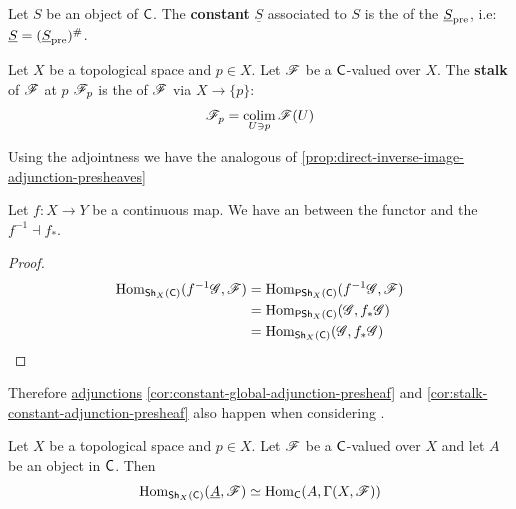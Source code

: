 \documentclass[../main.tex]{subfiles}
\begin{document}
\begin{definition} \label{def:constant-sheaf}
  Let \(S\) be an object of \(\mathsf{C}\).
  The \textbf{constant } \(\underline{S}\) associated to \(S\) is the  of the  \(\underline{S}_{\operatorname*{pre}}\), i.e: \(\underline{S} = (\underline{S}_{\operatorname*{pre}})^{\#}\).
\end{definition}

\begin{definition}[Stalk] \label{def:stalk-sheaf}
  Let \(X\) be a topological space and \(p \in X\). Let \(\mathscr{F}\) be a \(\mathsf{C}\)-valued  over \(X\).
  The \textbf{stalk} of \(\mathscr{F}\) at \(p\) \(\mathscr{F}_{p}\) is the  of \(\mathscr{F}\) via \(X \to \{p\}\):
  \begin{align*}
    \mathscr{F}_{p} = \operatorname*{colim}_{U \ni p} \mathscr{F}(U)
  \end{align*}
\end{definition}


Using the adjointness we have the analogous of \autoref{prop:direct-inverse-image-adjunction-presheaves}
\begin{proposition}
  Let \(f: X \to Y\) be a continuous map.
  We have an  between the  functor and the  \(f^{-1} \dashv f_{\ast}\).
\end{proposition}
\begin{proof}
  \begin{align*}
    \operatorname{Hom}_{\mathsf{Sh}_{X}(\mathsf{C})}(f^{-1} \mathscr{G}, \mathscr{F}) &= \operatorname{Hom}_{\mathsf{PSh}_{X}(\mathsf{C})}(f^{-1} \mathscr{G}, \mathscr{F})  \\
                                                            &= \operatorname{Hom}_{\mathsf{PSh}_{X}(\mathsf{C})}(\mathscr{G}, f_{\ast}\mathscr{G}) \\
                                                            &= \operatorname{Hom}_{\mathsf{Sh}_{X}(\mathsf{C})}(\mathscr{G}, f_{\ast}\mathscr{G})
  \end{align*}
\end{proof}

Therefore \hyperref[def:adjunction]{adjunctions} \autoref{cor:constant-global-adjunction-presheaf} and \autoref{cor:stalk-constant-adjunction-presheaf} also happen when considering .
\begin{corollary} \label{cor:constant-global-adjunction-sheaf}
  Let \(X\) be a topological space and \(p \in X\).
  Let \(\mathscr{F}\) be a \(\mathsf{C}\)-valued  over \(X\) and let \(A\) be an object in \(\mathsf{C}\).
  Then
  \begin{equation*}
    \operatorname{Hom}_{\mathsf{Sh}_{X}(\mathsf{C})}(\underline{A}, \mathscr{F}) \simeq \operatorname{Hom}_{\mathsf{C}}(A, \Gamma(X, \mathscr{F}))
  \end{equation*}
\end{corollary}
\end{document}
